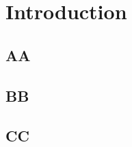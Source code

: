 \chapter{Introduction}

\lipsum[2]

\section{AA}
\lipsum[2]

\section{BB}
\lipsum[2]

\section{CC}
\lipsum[2]
